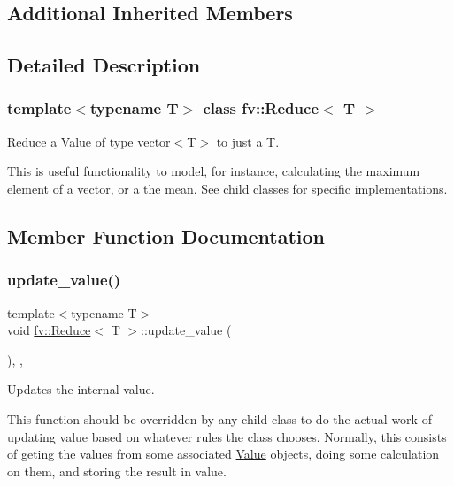 \subsection*{Additional Inherited Members}


\subsection{Detailed Description}
\subsubsection*{template$<$typename T$>$\newline
class fv\+::\+Reduce$<$ T $>$}

\hyperlink{classfv_1_1Reduce}{Reduce} a \hyperlink{classfv_1_1Value}{Value} of type vector$<$\+T$>$ to just a T. 

This is useful functionality to model, for instance, calculating the maximum element of a vector, or a the mean. See child classes for specific implementations. 

\subsection{Member Function Documentation}
\hypertarget{classfv_1_1Reduce_ab0809c4ab1884b84a7f88e005ade76a5}{}\label{classfv_1_1Reduce_ab0809c4ab1884b84a7f88e005ade76a5} 
\subsubsection{\texorpdfstring{update\+\_\+value()}{update\_value()}}
{\footnotesize\ttfamily template$<$typename T$>$ \\
void \hyperlink{classfv_1_1Reduce}{fv\+::\+Reduce}$<$ T $>$\+::update\+\_\+value (\begin{DoxyParamCaption}{ }\end{DoxyParamCaption})\hspace{0.3cm}{\ttfamily [inline]}, {\ttfamily [private]}, {\ttfamily [virtual]}}



Updates the internal value. 

This function should be overridden by any child class to do the actual work of updating value based on whatever rules the class chooses. Normally, this consists of geting the values from some associated \hyperlink{classfv_1_1Value}{Value} objects, doing some calculation on them, and storing the result in value. 

